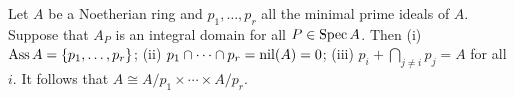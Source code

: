 \begin{exercise}\label{ex:9.11-ex}
Let $A$ be a Noetherian ring and $p_1, \ldots, p_r$ all the minimal prime ideals of $A$.
Suppose that $A_P$ is an integral domain for all $P \in \operatorname{Spec} A$. Then (i) $\operatorname{Ass} A
= \{p_1, \ldots, p_r\}$; (ii) $p_1 \cap \cdots \cap p_r = \operatorname{nil}(A) = 0$; (iii) $p_i + \bigcap_{j \neq i} p_j = A$ for all $i$. It
follows that $A \cong A/p_1 \times \cdots \times A/p_r$.
\end{exercise}
